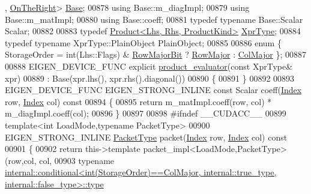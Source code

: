 \begin{DoxyCode}
      , \hyperlink{group__enums_ggac22de43beeac7a78b384f99bed5cee0ba99dc75d8e00b6c3a5bdc31940f47492b}{OnTheRight}> \hyperlink{struct_eigen_1_1internal_1_1diagonal__product__evaluator__base}{Base};
00878   \textcolor{keyword}{using} Base::m\_diagImpl;
00879   \textcolor{keyword}{using} Base::m\_matImpl;
00880   \textcolor{keyword}{using} Base::coeff;
00881   \textcolor{keyword}{typedef} \textcolor{keyword}{typename} Base::Scalar Scalar;
00882   
00883   \textcolor{keyword}{typedef} \hyperlink{group___core___module_class_eigen_1_1_product}{Product<Lhs, Rhs, ProductKind>} \hyperlink{group___core___module_class_eigen_1_1_product}{XprType};
00884   \textcolor{keyword}{typedef} \textcolor{keyword}{typename} XprType::PlainObject PlainObject;
00885   
00886   \textcolor{keyword}{enum} \{ StorageOrder = int(Lhs::Flags) & \hyperlink{group__flags_gae4f56c2a60bbe4bd2e44c5b19cbe8762}{RowMajorBit} ? \hyperlink{group__enums_ggaacded1a18ae58b0f554751f6cdf9eb13acfcde9cd8677c5f7caf6bd603666aae3}{RowMajor} : 
      \hyperlink{group__enums_ggaacded1a18ae58b0f554751f6cdf9eb13a0cbd4bdd0abcfc0224c5fcb5e4f6669a}{ColMajor} \};
00887 
00888   EIGEN\_DEVICE\_FUNC \textcolor{keyword}{explicit} \hyperlink{struct_eigen_1_1internal_1_1product__evaluator}{product\_evaluator}(\textcolor{keyword}{const} XprType& xpr)
00889     : Base(xpr.lhs(), xpr.rhs().diagonal())
00890   \{
00891   \}
00892   
00893   EIGEN\_DEVICE\_FUNC EIGEN\_STRONG\_INLINE \textcolor{keyword}{const} Scalar coeff(\hyperlink{namespace_eigen_a62e77e0933482dafde8fe197d9a2cfde}{Index} row, \hyperlink{namespace_eigen_a62e77e0933482dafde8fe197d9a2cfde}{Index} col)\textcolor{keyword}{ const}
00894 \textcolor{keyword}{  }\{
00895     \textcolor{keywordflow}{return} m\_matImpl.coeff(row, col) * m\_diagImpl.coeff(col);
00896   \}
00897   
00898 \textcolor{preprocessor}{#ifndef \_\_CUDACC\_\_}
00899   \textcolor{keyword}{template}<\textcolor{keywordtype}{int} LoadMode,\textcolor{keyword}{typename} PacketType>
00900   EIGEN\_STRONG\_INLINE \hyperlink{struct_eigen_1_1_packet_type}{PacketType} packet(\hyperlink{namespace_eigen_a62e77e0933482dafde8fe197d9a2cfde}{Index} row, \hyperlink{namespace_eigen_a62e77e0933482dafde8fe197d9a2cfde}{Index} col)\textcolor{keyword}{ const}
00901 \textcolor{keyword}{  }\{
00902     \textcolor{keywordflow}{return} this->\textcolor{keyword}{template} packet\_impl<LoadMode,PacketType>(row,col, col,
00903                                  \textcolor{keyword}{typename} 
      \hyperlink{class_eigen_1_1internal_1_1_tensor_lazy_evaluator_writable}{internal::conditional<int(StorageOrder)==ColMajor, internal::true\_type, internal::false\_type>::type}

\end{DoxyCode}

